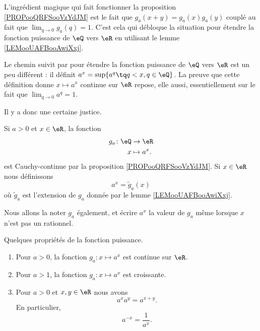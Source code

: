 \begin{normaltext}
    L'ingrédient magique qui fait fonctionner la proposition \ref{PROPooQRFSooVzYdJM} est le fait que \( g_a(x+y)=g_a(x)g_a(y)\) couplé au fait que \( \lim_{q\to 0} g_a(q)=1\). 
    C'est cela qui débloque la situation pour étendre la fonction puissance de \( \eQ\) vers \( \eR\) en utilisant le lemme \ref{LEMooUAFBooAwiXxj}. 

    Le chemin suivit par \cite{BIBooXUZHooOHWxiF} pour étendre la fonction puissance de \( \eQ\) vers \( \eR\) est un peu différent : il définit \( a^x=\sup\{ a^q\tq q<x,q\in \eQ \}\). La preuve que cette définition donne \( x\mapsto a^x\) continue sur \( \eR\) repose, elle aussi, essentiellement sur le fait que \( \lim_{q\to 0} a^q=1\).

    Il y a donc une certaine justice.
\end{normaltext}

\begin{propositionDef}  \label{DEFooOJMKooJgcCtq}
    Si \( a>0\) et \( x\in \eR\), la fonction
    \begin{equation}
        \begin{aligned}
            g_a\colon \eQ&\to \eR \\
            x&\mapsto a^x. 
        \end{aligned}
    \end{equation}
    est Cauchy-continue par la proposition \ref{PROPooQRFSooVzYdJM}. Si \( x\in \eR\) nous définissons
    \begin{equation}
        a^x=\tilde g_a(x)
    \end{equation}
    où \( \tilde g_a\) est l'extension de \( g_a\) donnée par le lemme \ref{LEMooUAFBooAwiXxj}.

    Nous allons la noter \( g_a\) également, et écrire \( a^x\) la valeur de \( g_a\) même lorsque \( x\) n'est pas un rationnel.
\end{propositionDef}

\begin{proposition}      \label{PROPooVADRooLCLOzP}
    Quelques propriétés de la fonction puissance. 
    \begin{enumerate}
        \item       \label{ITEMooQHYRooJIewyp}
            Pour \( a>0\), la fonction \( g_a\colon x\mapsto a^x\) est continue sur \( \eR\).
        \item       \label{ITEMooIZBLooSGtWIp}
            Pour \( a>1\), la fonction \( g_a\colon x\mapsto a^x\) est croissante.
        \item       \label{ITEMooSCJBooNVJZah}
            Pour \( a>0\) et \( x,y\in \eR\) nous avons
            \begin{equation}        \label{EQooEWIHooDRAQGR}
                a^xa^y=a^{x+y}.
            \end{equation}
            En particulier, 
            \begin{equation}
                a^{-x}=\frac{1}{ a^x }.
            \end{equation}
    \end{enumerate}
\end{proposition}

